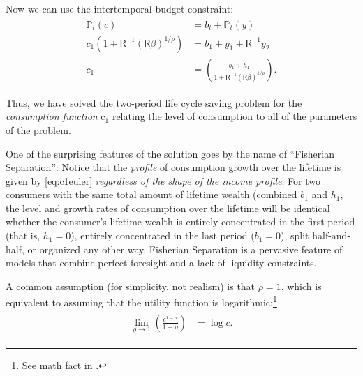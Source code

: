 \documentclass{scrartcl}
\begin{document}
  Now we can use the intertemporal budget constraint:
  \begin{equation}\begin{gathered}\begin{aligned} {\mathbb{P}}_{t}(\boldsymbol{\mathit{c}}) & = \boldsymbol{\mathit{b}}_{t}+{\mathbb{P}}_{t}(y) \\ \boldsymbol{\mathit{c}}_{1}\left(1+\mathsf{R}^{-1}(\mathsf{R}\beta)^{1/\rho}\right) & = \boldsymbol{\mathit{b}}_{1}+\boldsymbol{\mathit{y}}_{1}+\mathsf{R}^{-1}\boldsymbol{\mathit{y}}_{2} \\ \boldsymbol{\mathit{c}}_{1} & = \left(\frac{\boldsymbol{\mathit{b}}_{1}+\boldsymbol{\mathit{h}}_{1}}{1+\mathsf{R}^{-1}(\mathsf{R}\beta)^{1/\rho}}\right).
      \end{aligned}\end{gathered}\end{equation}

  Thus, we have solved the two-period life cycle saving problem for the \textit{consumption function} $\mathrm{c}_{1}$ relating the level of consumption to all of the parameters of the problem.

  One of the surprising features of the solution goes by the name of ``Fisherian Separation'': Notice that the \textit{profile} of consumption growth over the lifetime is given by \eqref{eq:c1euler} \textit{regardless of the shape of the income profile}.
  For two consumers with the same total amount of lifetime wealth (combined $\boldsymbol{\mathit{b}}_{1}$ and $\boldsymbol{\mathit{h}}_{1}$, the level and growth rates of consumption over the lifetime will be identical whether the consumer's lifetime wealth is entirely concentrated in the first period (that is, $\boldsymbol{\mathit{h}}_{1}=0$), entirely concentrated in the last period ($\boldsymbol{\mathit{b}}_{1}=0$), split half-and-half, or organized any other way.
  Fisherian Separation is a pervasive feature of models that combine perfect foresight and a lack of liquidity constraints.

  A common assumption (for simplicity, not realism) is that $\rho=1$, which is equivalent to assuming that the utility function is logarithmic:\footnote{See math fact \CRRALim in \MathFactsList.}
  \begin{equation}\begin{gathered}\begin{aligned} \lim_{\rho \rightarrow 1} \left(\frac{\boldsymbol{\mathit{c}}^{1-\rho}}{1-\rho}\right) & = \log c.
      \end{aligned}\end{gathered}\end{equation}
\end{document}
